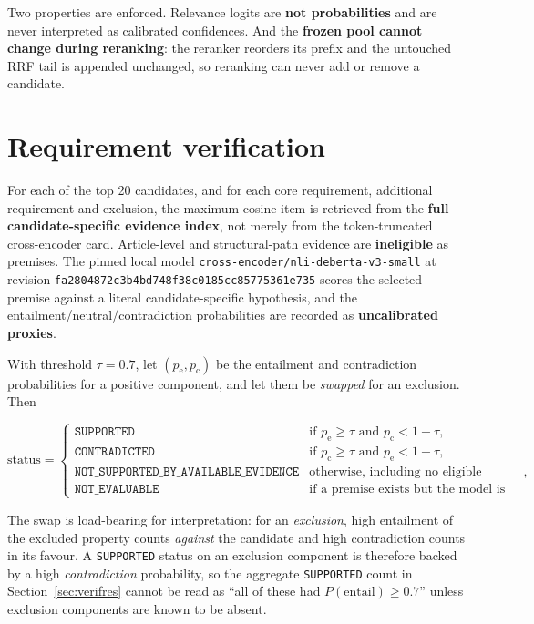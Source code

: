 \documentclass[11pt,a4paper]{article}
\newcommand{\hx}[2]{\texttt{#1}\allowbreak\texttt{#2}}
\begin{document}
Two properties are enforced. Relevance logits are \textbf{not probabilities} and are never interpreted as
calibrated confidences. And the \textbf{frozen pool cannot change during reranking}: the reranker reorders
its prefix and the untouched RRF tail is appended unchanged, so reranking can never add or remove a
candidate.

\section{Requirement verification}
\label{sec:verify}

For each of the top 20 candidates, and for each core requirement, additional requirement and exclusion, the
maximum-cosine item is retrieved from the \textbf{full candidate-specific evidence index}, not merely from
the token-truncated cross-encoder card. Article-level and structural-path evidence are \textbf{ineligible}
as premises. The pinned local model \texttt{cross-encoder/nli-deberta-v3-small} at revision
\hx{fa2804872c3b4bd748f3}{8c0185cc85775361e735} scores the selected premise against a literal
candidate-specific hypothesis, and the entailment/neutral/contradiction probabilities are recorded as
\textbf{uncalibrated proxies}.

With threshold $\tau = 0.7$, let $(p_{\text{e}}, p_{\text{c}})$ be the entailment and contradiction
probabilities for a positive component, and let them be \emph{swapped} for an exclusion. Then

{\small
\begin{equation}
\mathrm{status} =
\begin{cases}
\texttt{SUPPORTED} & \text{if } p_{\text{e}} \ge \tau \text{ and } p_{\text{c}} < 1-\tau,\\[2pt]
\texttt{CONTRADICTED} & \text{if } p_{\text{c}} \ge \tau \text{ and } p_{\text{e}} < 1-\tau,\\[2pt]
\texttt{NOT\_SUPPORTED\_BY\_AVAILABLE\_EVIDENCE} & \text{otherwise, including no eligible premise},\\[2pt]
\texttt{NOT\_EVALUABLE} & \text{if a premise exists but the model is unavailable.}
\end{cases}
\label{eq:status}
\end{equation}
}

The swap is load-bearing for interpretation: for an \emph{exclusion}, high entailment of the excluded
property counts \emph{against} the candidate and high contradiction counts in its favour. A
\texttt{SUPPORTED} status on an exclusion component is therefore backed by a high \emph{contradiction}
probability, so the aggregate \texttt{SUPPORTED} count in Section~\ref{sec:verifres} cannot be read as ``all
of these had $P(\text{entail}) \ge 0.7$'' unless exclusion components are known to be absent.
\end{document}
